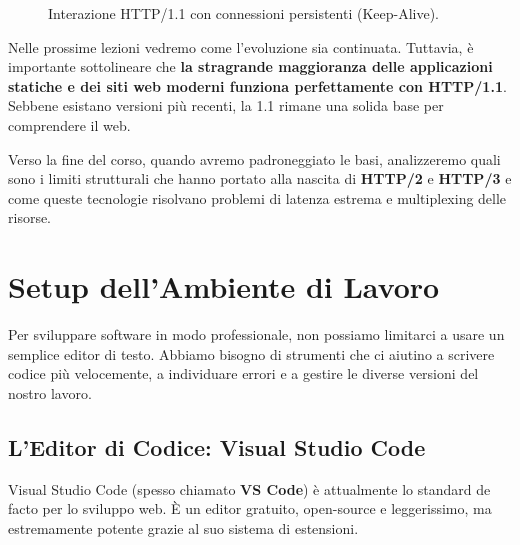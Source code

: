 \documentclass[11pt,a4paper]{report}
\begin{document}
\begin{figure}[ht]
\centering
{}
\caption{Interazione HTTP/1.1 con connessioni persistenti (Keep-Alive).}
\label{fig:http11_conn}
\end{figure}

Nelle prossime lezioni vedremo come l'evoluzione sia continuata. Tuttavia, è importante sottolineare che \textbf{la stragrande maggioranza delle applicazioni statiche e dei siti web moderni funziona perfettamente con HTTP/1.1}. Sebbene esistano versioni più recenti, la 1.1 rimane una solida base per comprendere il web.

Verso la fine del corso, quando avremo padroneggiato le basi, analizzeremo quali sono i limiti strutturali che hanno portato alla nascita di \textbf{HTTP/2} e \textbf{HTTP/3} e come queste tecnologie risolvano problemi di latenza estrema e multiplexing delle risorse.

\chapter{Setup dell'Ambiente di Lavoro}

Per sviluppare software in modo professionale, non possiamo limitarci a usare un semplice editor di testo. Abbiamo bisogno di strumenti che ci aiutino a scrivere codice più velocemente, a individuare errori e a gestire le diverse versioni del nostro lavoro.

\section{L'Editor di Codice: Visual Studio Code}
Visual Studio Code (spesso chiamato \textbf{VS Code}) è attualmente lo standard de facto per lo sviluppo web. È un editor gratuito, open-source e leggerissimo, ma estremamente potente grazie al suo sistema di estensioni.
\end{document}
